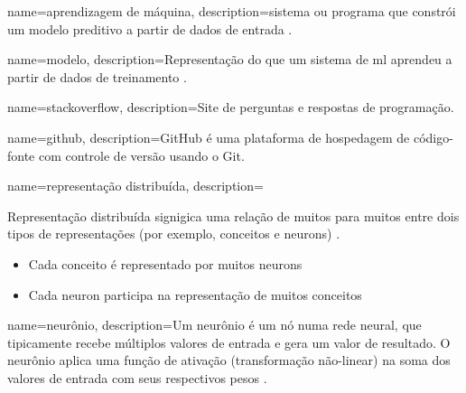 {
    name=aprendizagem de máquina,
    description={sistema ou programa que constrói um modelo preditivo a partir de dados de entrada \citep{glossary-ml}.}
}

{
    name=modelo,
    description={Representação do que um sistema de \gls{ml} aprendeu a partir de dados de treinamento \citep{glossary-ml}.}
}

{
    name=stackoverflow,
    description={Site de perguntas e respostas de programação.}
}

{
    name=github,
    description={GitHub é uma plataforma de hospedagem de código-fonte com controle de versão usando o Git.}
}

{
    name=representação distribuída,
    description={Representação distribuída signigica uma relação de muitos para muitos entre dois tipos de representações (por exemplo, conceitos e \gls{neuron}s) \citep{Hinton-distributed-representatons:1986}. 
    \begin{itemize}
        \item Cada conceito é representado por muitos \gls{neuron}s
        \item Cada \gls{neuron} participa na representação de muitos conceitos
    \end{itemize}
    }
}

{
    name=neurônio,
    description={Um neurônio é um nó numa rede neural, que tipicamente recebe múltiplos valores de entrada e gera um valor de resultado. O neurônio aplica uma função de ativação (transformação não-linear) na soma dos valores de entrada com seus respectivos pesos \citep{glossary-ml}.}
}




